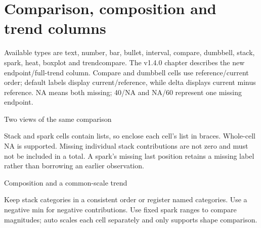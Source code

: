 \section{Comparison, composition and trend columns}
Available types are text, number, bar, bullet, interval, compare, dumbbell, stack,
spark, heat, boxplot and trendcompare. The v1.4.0 chapter describes the new
endpoint/full-trend column. Compare and dumbbell cells use reference/current order; default labels
display current/reference, while delta displays current minus reference.
NA means both missing; 40/NA and NA/60 represent one missing endpoint.
\begin{demo}{Two views of the same comparison}
\begin{center}
\begin{gradtable}[align=c,header align=c,text width=22mm,graphic width=32mm,
  label width=12mm,column sep=6pt,row stretch=1.8]
\end{gradtable}
\end{center}
\end{demo}
Stack and spark cells contain lists, so enclose each cell's list in braces.
Whole-cell NA is supported. Missing individual stack contributions are not zero
and must not be included in a total. A spark's missing last position retains a
missing label rather than borrowing an earlier observation.
\begin{demo}{Composition and a common-scale trend}
\begin{center}
\begin{gradtable}[align=c,header align=c,text width=22mm,graphic width=32mm,
  label width=12mm,column sep=6pt,row stretch=1.8]
\end{gradtable}
\end{center}
\end{demo}
Keep stack categories in a consistent order or register named categories.
Use a negative min for negative contributions. Use fixed spark ranges to compare
magnitudes; auto scales each cell separately and only supports shape comparison.
